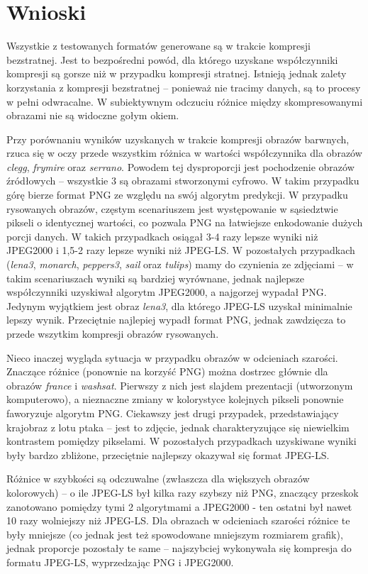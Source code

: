 \section{Wnioski}

Wszystkie z testowanych formatów generowane są w trakcie kompresji bezstratnej. Jest to bezpośredni powód, dla którego uzyskane współczynniki kompresji są gorsze niż w przypadku kompresji stratnej. Istnieją jednak zalety korzystania z kompresji bezstratnej -- ponieważ nie tracimy danych, są to procesy w pełni odwracalne. W subiektywnym odczuciu różnice między skompresowanymi obrazami nie są widoczne gołym okiem.

Przy porównaniu wyników uzyskanych w trakcie kompresji obrazów barwnych, rzuca się w oczy przede wszystkim różnica w wartości współczynnika dla obrazów \textit{clegg}, \textit{frymire} oraz \textit{serrano}. Powodem tej dysproporcji jest pochodzenie obrazów źródłowych -- wszystkie 3 są obrazami stworzonymi cyfrowo. W takim przypadku górę bierze format PNG ze względu na swój algorytm predykcji. W przypadku rysowanych obrazów, częstym scenariuszem jest występowanie w sąsiedztwie pikseli o identycznej wartości, co pozwala PNG na łatwiejsze enkodowanie dużych porcji danych. W takich przypadkach osiągał 3-4 razy lepsze wyniki niż JPEG2000 i 1,5-2 razy lepsze wyniki niż JPEG-LS. W pozostałych przypadkach (\textit{lena3}, \textit{monarch}, \textit{peppers3}, \textit{sail} oraz \textit{tulips}) mamy do czynienia ze zdjęciami -- w takim scenariuszach wyniki są bardziej wyrównane, jednak najlepsze współczynniki uzyskiwał algorytm JPEG2000, a najgorzej wypadał PNG. Jedynym wyjątkiem jest obraz \textit{lena3}, dla którego JPEG-LS uzyskał minimalnie lepszy wynik. Przeciętnie najlepiej wypadł format PNG, jednak zawdzięcza to przede wszytkim kompresji obrazów rysowanych.

Nieco inaczej wygląda sytuacja w przypadku obrazów w odcieniach szarości. Znaczące różnice (ponownie na korzyść PNG) można dostrzec głównie dla obrazów \textit{france} i \textit{washsat}. Pierwszy z nich jest slajdem prezentacji (utworzonym komputerowo), a nieznaczne zmiany w kolorystyce kolejnych pikseli ponownie faworyzuje algorytm PNG. Ciekawszy jest drugi przypadek, przedstawiający krajobraz z lotu ptaka -- jest to zdjęcie, jednak charakteryzujące się niewielkim kontrastem pomiędzy pikselami. W pozostałych przypadkach uzyskiwane wyniki były bardzo zbliżone, przeciętnie najlepszy okazywał się format JPEG-LS.

Różnice w szybkości są odczuwalne (zwłaszcza dla większych obrazów kolorowych) -- o ile JPEG-LS był kilka razy szybszy niż PNG, znaczący przeskok zanotowano pomiędzy tymi 2 algorytmami a JPEG2000 - ten ostatni był nawet 10 razy wolniejszy niż JPEG-LS. Dla obrazach w odcieniach szarości różnice te były mniejsze (co jednak jest też spowodowane mniejszym rozmiarem grafik), jednak proporcje pozostały te same -- najszybciej wykonywała się kompresja do formatu JPEG-LS, wyprzedzając PNG i JPEG2000.